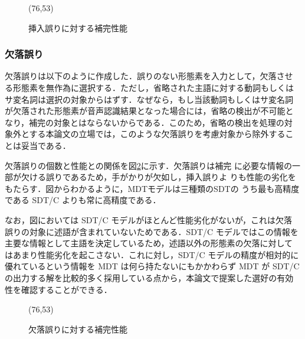 \begin{figure}
\begin{center}
    \begin{epsf}
    \end{epsf}
    \begin{draft}
    \atari(76,53)
    \end{draft}
\vspace{1mm}
\caption{挿入誤りに対する補完性能}
\label{fig:insert}
\end{center}
\end{figure}


\subsubsection{欠落誤り}

欠落誤りは以下のように作成した．誤りのない形態素を入力として，欠落させ
る形態素を無作為に選択する．ただし，省略された主語に対する動詞もしくは
サ変名詞は選択の対象からはずす．なぜなら，もし当該動詞もしくはサ変名詞
が欠落された形態素が音声認識結果となった場合には，省略の検出が不可能と
なり，補完の対象とはならないからである．このため，省略の検出を処理の対
象外とする本論文の立場では，このような欠落誤りを考慮対象から除外するこ
とは妥当である．

欠落誤りの個数と性能との関係を図\ref{fig:delete}に示す．欠落誤りは補完
に必要な情報の一部が欠ける誤りであるため，手がかりが欠如し，挿入誤りよ
りも性能の劣化をもたらす．図からわかるように，MDTモデルは三種類のSDTの
うち最も高精度である SDT/C よりも常に高精度である．

なお，図においては SDT/C モデルがほとんど性能劣化がないが，これは欠落
誤りの対象に述語が含まれていないためである．SDT/C モデルではこの情報を
主要な情報として主語を決定しているため，述語以外の形態素の欠落に対して
はあまり性能劣化を起こさない．これに対し，SDT/C モデルの精度が相対的に
優れているという情報を MDT は何ら持たないにもかかわらず MDT が SDT/C 
の出力する解を比較的多く採用している点から，本論文で提案した選好の有効
性を確認することができる．


\begin{figure}
\begin{center}
    \begin{epsf}
    \end{epsf}
    \begin{draft}
    \atari(76,53)
    \end{draft}
\vspace{1mm}
\caption{欠落誤りに対する補完性能}
\label{fig:delete}
\end{center}
\end{figure}


